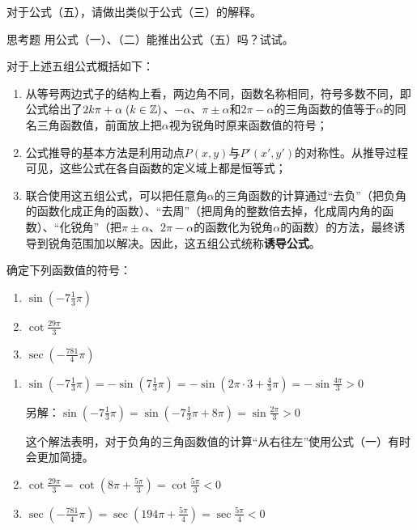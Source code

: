 对于公式（五），请做出类似于公式（三）的解释。

\begin{thm}
    {思考题} 用公式（一）、（二）能推出公式（五）吗？试试。
\end{thm}

对于上述五组公式概括如下：
\begin{enumerate}
\item 从等号两边式子的结构上看，两边角不同，函数名称相同，符号多数不同，即公式给出了$2k\pi+\alpha\; (k\in\mathbb{Z})$、$-\alpha$、$\pi\pm\alpha$和$2\pi-\alpha$的三角函数的值等于$\alpha$的同名三角函数值，前面放上把$\alpha$视为锐角时原来函数值的符号；
\item 公式推导的基本方法是利用动点$P(x,y)$与$P'(x',y')$的对称性。从推导过程可见，这些公式在各自函数的定义域上都是恒等式；
\item 联合使用这五组公式，可以把任意角$\alpha$的三角函数的计算通过“去负”（把负角的函数化成正角的函数）、“去周”（把周角的整数倍去掉，化成周内角的函数）、“化锐角”（把$\pi\pm\alpha$、$2\pi-\alpha$的函数化为锐角$\alpha$的函数）的方法，最终诱导到锐角范围加以解决。因此，这五组公式统称\textbf{诱导公式}。
\end{enumerate}

\begin{example}
确定下列函数值的符号：
\begin{multicols}{3}
\begin{enumerate}[(1)]
    \item $\sin\left(-7\frac{1}{3}\pi\right)$
    \item $\cot\frac{29\pi}{3}$
    \item $\sec\left(-\frac{781}{4}\pi\right)$
\end{enumerate}
\end{multicols}
\end{example}

\begin{solution}
\begin{enumerate}[(1)]
    \item $\sin\left(-7\frac{1}{3}\pi\right)=-\sin\left(7\frac{1}{3}\pi\right)=-\sin\left(2\pi\cdot 3+\frac{4}{3}\pi\right)=-\sin\frac{4\pi}{3}>0$

另解：$\sin\left(-7\frac{1}{3}\pi\right)=\sin\left(-7\frac{1}{3}\pi+8\pi\right)=\sin\frac{2\pi}{3}>0$

这个解法表明，对于负角的三角函数值的计算“从右往左”使用公式（一）有时会更加简捷。

\item $\cot\frac{29\pi}{3}=\cot\left(8\pi+\frac{5\pi}{3}\right)=\cot\frac{5\pi}{3}<0$
\item $\sec\left(-\frac{781}{4}\pi\right)=\sec\left(194\pi+\frac{5\pi}{4}\right)=\sec\frac{5\pi}{4}<0$
\end{enumerate}    
\end{solution}

